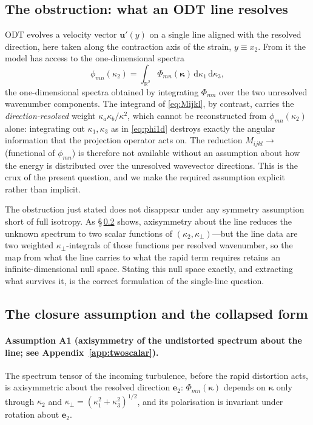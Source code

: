 \documentclass[lineno]{JFM-FLM_Au}
\begin{document}
\subsection{The obstruction: what an ODT line resolves}\label{sec:obstruction}

ODT evolves a velocity vector $\boldsymbol{u}'(y)$ on a single line aligned
with the resolved direction, here taken along the contraction axis of the
strain, $y\equiv x_2$. From it the model has access to the one-dimensional
spectra
\begin{equation}
  \phi_{mn}(\kappa_2)
  = \int_{\mathbb{R}^2}
      \Phi_{mn}(\boldsymbol{\kappa})\,
      \mathrm{d}\kappa_1\,\mathrm{d}\kappa_3,
  \label{eq:phi1d}
\end{equation}
the one-dimensional spectra obtained by integrating $\Phi_{mn}$ over the two
unresolved wavenumber components. The integrand of \eqref{eq:Mijkl}, by
contrast, carries the \emph{direction-resolved} weight
$\kappa_a\kappa_b/\kappa^2$, which cannot be reconstructed from
$\phi_{mn}(\kappa_2)$ alone: integrating out $\kappa_1,\kappa_3$ as in
\eqref{eq:phi1d} destroys exactly the angular information that the projection
operator acts on. The reduction $M_{ijkl}\!\to\!$ (functional of
$\phi_{mn}$) is therefore not available without an assumption about how the
energy is distributed over the unresolved wavevector directions. This is the
crux of the present question, and we make the required assumption explicit
rather than implicit.

The obstruction just stated does not disappear under any symmetry
assumption short of full isotropy. As \S\,\ref{sec:assumption} shows,
axisymmetry about the line reduces the unknown spectrum to two scalar
functions of $(\kappa_2,\kappa_\perp)$---but the line data are two weighted
$\kappa_\perp$-integrals of those functions per resolved wavenumber, so the
map from what the line carries to what the rapid term requires retains an
infinite-dimensional null space. Stating this null space exactly, and
extracting what survives it, is the correct formulation of the single-line
question.

\subsection{The closure assumption and the collapsed form}
\label{sec:assumption}

\paragraph{Assumption A1 (axisymmetry of the undistorted spectrum about the line; see Appendix~\ref{app:twoscalar}).} The spectrum tensor of the incoming turbulence, before the rapid
distortion acts, is axisymmetric about the resolved direction $\boldsymbol{e}_2$:
$\Phi_{mn}(\boldsymbol{\kappa})$ depends on $\boldsymbol{\kappa}$ only through
$\kappa_2$ and $\kappa_\perp=(\kappa_1^2+\kappa_3^2)^{1/2}$, and its
polarisation is invariant under rotation about $\boldsymbol{e}_2$.
\end{document}
